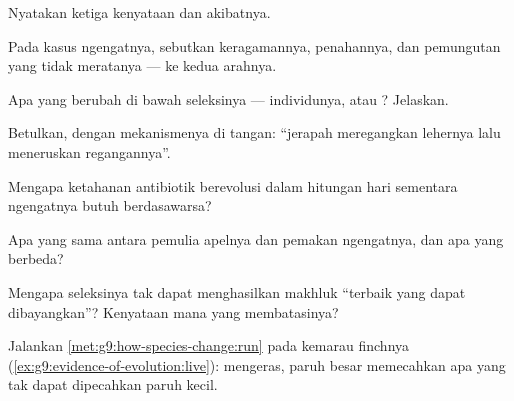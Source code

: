 \begin{exercise}[$\star$]\label{exo:g9:how-species-change:1}
Nyatakan ketiga kenyataan  dan akibatnya.
\end{exercise}

\begin{exercise}[$\star$]\label{exo:g9:how-species-change:2}
Pada kasus ngengatnya, sebutkan keragamannya, penahannya,
dan pemungutan yang tidak meratanya --- ke kedua arahnya.
\end{exercise}

\begin{exercise}[$\star$]\label{exo:g9:how-species-change:3}
Apa yang berubah di bawah seleksinya --- individunya, atau
? Jelaskan.
\end{exercise}

\begin{exercise}[$\star$]\label{exo:g9:how-species-change:4}
Betulkan, dengan mekanismenya di tangan: ``jerapah
meregangkan lehernya lalu meneruskan regangannya''.
\end{exercise}

\begin{exercise}[$\star$]\label{exo:g9:how-species-change:5}
Mengapa ketahanan antibiotik berevolusi dalam hitungan hari
sementara ngengatnya butuh berdasawarsa?
\end{exercise}

\begin{exercise}[$\star$]\label{exo:g9:how-species-change:6}
Apa yang sama antara pemulia apelnya dan  pemakan
ngengatnya, dan apa yang berbeda?
\end{exercise}

\begin{exercise}[$\star\star$]\label{exo:g9:how-species-change:7}
Mengapa seleksinya tak dapat menghasilkan makhluk ``terbaik
yang dapat dibayangkan''? Kenyataan mana yang membatasinya?
\end{exercise}

\begin{exercise}[$\star\star$]\label{exo:g9:how-species-change:8}
Jalankan \cref{met:g9:how-species-change:run} pada kemarau
 finchnya (\cref{ex:g9:evidence-of-evolution:live}):
 mengeras, paruh besar memecahkan apa yang tak dapat
dipecahkan paruh kecil.
\end{exercise}

